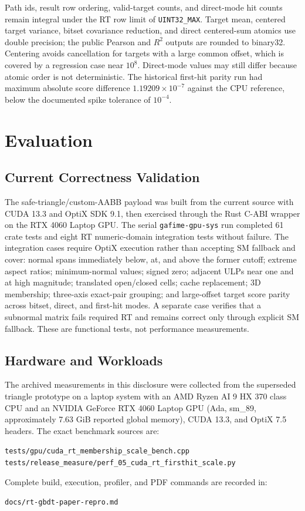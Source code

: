 \documentclass[11pt]{article}
\begin{document}
Path ids, result row ordering, valid-target counts, and direct-mode hit counts
remain integral under the RT row limit of \texttt{UINT32\_MAX}. Target mean,
centered target variance, bitset covariance reduction, and direct centered-sum
atomics use double precision; the public Pearson and $R^2$ outputs are rounded to
binary32. Centering avoids cancellation for targets with a large common offset,
which is covered by a regression case near $10^8$. Direct-mode values may still
differ because atomic order is not deterministic. The historical first-hit parity
run had maximum absolute score difference $1.19209 \times 10^{-7}$ against the
CPU reference, below the documented spike tolerance of $10^{-4}$.

\section{Evaluation}

\subsection{Current Correctness Validation}

The safe-triangle/custom-AABB payload was built from the current source
with CUDA 13.3 and OptiX SDK 9.1, then exercised through the Rust C-ABI wrapper
on the RTX 4060 Laptop GPU. The serial \texttt{gafime-gpu-sys} run completed 61
crate tests and eight RT numeric-domain integration tests without failure. The
integration cases require OptiX execution rather than accepting SM fallback and
cover: normal spans immediately below, at, and above the former cutoff; extreme
aspect ratios; minimum-normal values; signed zero; adjacent ULPs near one and
at high magnitude; translated open/closed cells; cache replacement; 3D
membership; three-axis exact-pair grouping; and large-offset target score parity
across bitset, direct, and first-hit modes. A separate case verifies that a subnormal
matrix fails required RT and remains correct only through explicit SM fallback.
These are functional tests, not performance measurements.

\subsection{Hardware and Workloads}

The archived measurements in this disclosure were collected from the
superseded triangle prototype on a laptop system with an
AMD Ryzen AI 9 HX 370 class CPU and an NVIDIA GeForce RTX 4060 Laptop GPU
(Ada, sm\_89, approximately 7.63 GiB reported global memory), CUDA 13.3, and
OptiX 7.5 headers. The exact benchmark sources are:
\begin{center}
\footnotesize
\mbox{\texttt{tests/gpu/cuda\_rt\_membership\_scale\_bench.cpp}}\\
\mbox{\texttt{tests/release\_measure/perf\_05\_cuda\_rt\_firsthit\_scale.py}}
\end{center}
Complete build, execution, profiler, and PDF commands are recorded in:
\begin{center}
\footnotesize
\mbox{\texttt{docs/rt-gbdt-paper-repro.md}}
\end{center}
\end{document}
